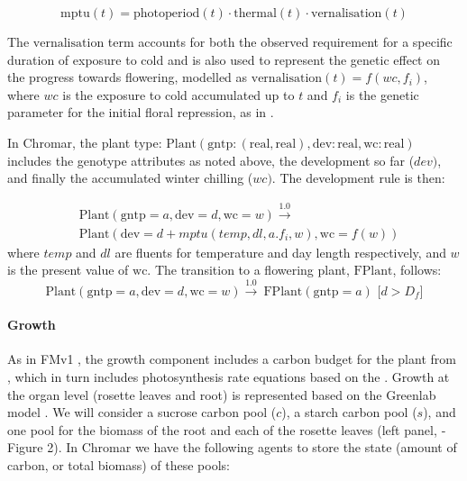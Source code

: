 \documentclass[phd]{infthesis}
\newcommand{\mr}[1]{\mathrm{#1}}
\newcommand{\ar}[2]{\mr{#1} \! = \! {#2}}
\begin{document}
\[\mr{mptu}(t) = \mr{photoperiod}(t) \cdot \mr{thermal}(t) \cdot \mr{vernalisation}(t)\]

The \(\mr{vernalisation}\) term accounts for both the observed requirement for
a specific duration of exposure to cold and is also used to represent the
genetic effect on the progress towards flowering, modelled as
\(\mr{vernalisation}(t) = f(wc,f_{i})\), where $wc$ is the exposure to
cold accumulated up to \(t\) and \(f_{i}\) is the genetic parameter for the
initial floral repression, as in \citet{wilczek_effects_2009}.

In Chromar, the plant type:
\(\mr{Plant}(\mr{gntp}:(\mr{real},\mr{real}),\mr{dev}:\mr{real},\mr{wc}:\mr{real})\)
includes the genotype attributes as noted above, the development so far
(\(dev)\), and finally the accumulated winter chilling (\(wc)\). The
development rule is then:

\begin{equation*}
\begin{split}
&\mr{Plant}(\ar{gntp}{a},\ar{dev}{d}, \ar{wc}{w}) \xrightarrow{1.0} \\ 
&\mr{Plant}(\ar{dev}{d + mptu( temp, dl, a.f_{i}, w )},\ar{wc}{f(w)})
\end{split}
\end{equation*}
where $temp$ and $dl$ are fluents for temperature and day
length respectively, and $w$ is the present value of $\mr{wc}$. The transition to a
flowering plant, \(\mr{FPlant}\), follows:
$$
\mr{Plant}(\ar{gntp}{a}, \ar{dev}{d}, \ar{wc}{w}) \xrightarrow{1.0} \mr{\ FPlant}(\ar{gntp}{a}) \, \, \lbrack d > D_{f} \rbrack
$$
\paragraph{Growth}
\label{growth}

As in FMv1 \citep{chew_multiscale_2014}, the growth component includes a carbon
budget for the plant from \citet{rasse_leaf_2006}, which in turn includes
photosynthesis rate equations based on the \citet{farquhar_biochemical_1980}
. Growth at the organ level (rosette leaves and root) is represented based on
the Greenlab model \citep{christophe_model-based_2008}. We will consider a
sucrose carbon pool (\(c\)), a starch carbon pool (\(s\)), and one pool for the
biomass of the root and each of the rosette leaves (left panel, ­­­Figure 2). In
Chromar we have the following agents to store the state (amount of carbon, or
total biomass) of these pools:
\end{document}
